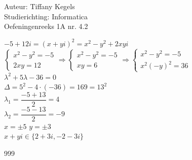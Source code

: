 \documentclass[a4paper]{article}
\begin{document}
  
\noindent \large Auteur: Tiffany Kegels \\
\noindent \large Studierichting: Informatica\\
\noindent \large Oefeningenreeks 1A nr. 4.2\\

\medskip

\normalsize

$-5+12i = (x+yi)^2 = x^2 - y^2 + 2xyi$\\

$\left\{
	\begin{array}{l}
		x^2 - y^2 = -5\\
		2xy = 12
	\end{array}
\right .
\Rightarrow
\left\{
	\begin{array}{l}
		x^2 - y^2 = -5\\
		xy = 6
	\end{array}
\right .
\Rightarrow
\left\{
	\begin{array}{l}
		x^2 - y^2 = -5\\
		x^2(-y)^2 = 36
	\end{array}
\right .$\\

$\lambda^2 + 5\lambda - 36 = 0$\\

$\Delta = 5^2 -4\cdot(-36) = 169 = 13^2$\\

$\lambda_1 = \dfrac{-5 + 13}{2} = 4$\\

$\lambda_2 = \dfrac{-5 -13}{2} = -9$\\

$x = \pm5$
$y = \pm3$\\

$x+yi \in \{2+3i,-2-3i\}$\\

\begin{thebibliography}{999}

\end{thebibliography}
\end{document}
